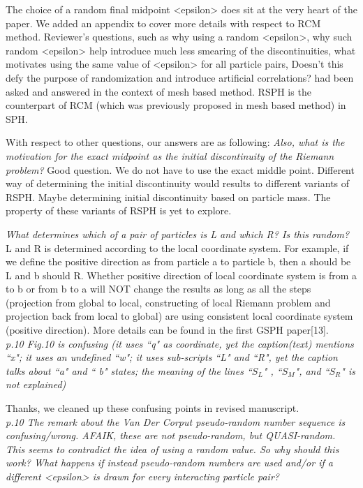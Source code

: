 \documentclass[10pt,a4paper]{article}
\begin{document}
The choice of a random final midpoint <epsilon> does sit at the very heart of the paper. We added an appendix to cover more details with respect to RCM method. Reviewer's questions, such as why using a random <epsilon>, why such random <epsilon> help introduce much less smearing of the discontinuities, what motivates using the same value of <epsilon> for all particle pairs, Doesn't this defy the purpose of randomization and introduce artificial correlations? had been asked and answered in the context of mesh based method. RSPH is the counterpart of RCM (which was previously proposed in mesh based method) in SPH.

With respect to other questions, our answers are as following: 
\textit{Also, what is the motivation for the exact midpoint as the initial discontinuity of the Riemann problem?}
Good question. We do not have to use the exact middle point. Different way of determining the initial discontinuity would results to different variants of RSPH. Maybe determining initial discontinuity based on particle mass. The property of these variants of RSPH is yet to explore. 

\textit{ What determines which of a pair of particles is L and which R? Is this random? }
L and R is determined according to the local coordinate system. For example, if we define the positive direction as from particle a to particle b, then a should be L and b should R. Whether positive direction of local coordinate system is from a to b or from b to a will NOT change the results as long as all the steps (projection from global to local, constructing of local Riemann problem and projection back from local to global) are using consistent local coordinate system (positive direction). More details can be found in the first GSPH paper[13].
\\[3pt]


\textit{p.10 Fig.10 is confusing (it uses ``q" as coordinate, yet the caption(text) mentions ``x"; it uses an undefined ``w"; it uses sub-scripts ``L" and ``R", yet the caption talks about ``a" and `` b" states; the meaning of the lines ``$S_L$" , ``$S_M$", and ``$S_R$" is not explained)}

Thanks, we cleaned up these confusing points in revised manuscript.
\\[3pt]

\textit{p.10 The remark about the Van Der Corput pseudo-random number sequence is confusing/wrong. AFAIK, these are not pseudo-random, but QUASI-random. This seems to contradict the idea of using a random value. So why should this work?
What happens if instead pseudo-random numbers are used and/or if a different <epsilon> is drawn for every interacting particle pair?}
\end{document}
